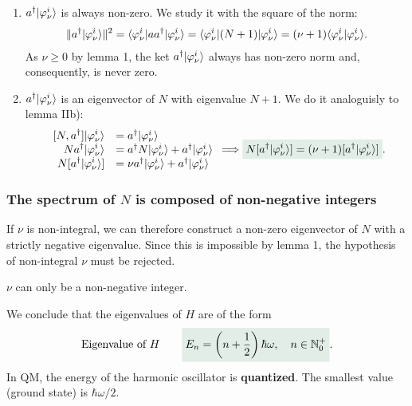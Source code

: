 \begin{itemize}[itemsep=0pt,topsep=0pt]
\begin{enumerate}[itemsep=0pt,topsep=0pt,label=\roman*)]
        \item $a^\dagger|\varphi_\nu^i\rangle$ is always non-zero.
        We study it with the square of the norm:
        \begin{align*}
            \|a^\dagger|\varphi_\nu^i\rangle\|^2=\langle\varphi_\nu^i|aa^\dagger|\varphi_\nu^i\rangle=\langle\varphi_\nu^i|(N+1)|\varphi_\nu^i\rangle=(\nu+1)\langle\varphi_\nu^i|\varphi_\nu^i\rangle.
        \end{align*}
        As $\nu\geq0$ by lemma 1, the ket $a^\dagger|\varphi_\nu^i\rangle$ always has non-zero norm and, consequently, is never zero.
        \item $a^\dagger|\varphi_\nu^i\rangle$ is an eigenvector of $N$ with eigenvalue $N+1$.
        We do it analoguisly to lemma IIb):
        \begin{align*}
            \begin{array}{rl}
            \displaystyle[N,a^\dagger]\ket{\varphi_\nu^i}&=a^\dagger\ket{\varphi_\nu^i}\\
            \displaystyle Na^\dagger\ket{\varphi_\nu^i}&=a^\dagger N\ket{\varphi_\nu^i}+a^\dagger\ket{\varphi_\nu^i}\\
            \displaystyle N[a^\dagger\ket{\varphi_\nu^i}]&=\nu a^\dagger\ket{\varphi_\nu^i}+a^\dagger\ket{\varphi_\nu^i}                
            \end{array}\Longrightarrow
            \highlight{N[a^\dagger\ket{\varphi_\nu^i}]=(\nu+1)[a^\dagger\ket{\varphi_\nu^i}]}.
        \end{align*}
    \end{enumerate}
\end{itemize}

%
\subsubsection{The spectrum of $N$ is composed of non-negative integers}
If $\nu$ is non-integral, we can therefore construct a non-zero eigenvector of $N$ with a strictly negative eigenvalue.
Since this is impossible by lemma 1, the hypothesis of non-integral $\nu$ must be rejected.

\begin{emphasizer}
    $\nu$ can only be a non-negative integer.
\end{emphasizer}

We conclude that the eigenvalues of $H$ are of the form 
\begin{align}
    \text{Eigenvalue of $H$}\qquad\highlight{E_n=\left(n+\frac{1}{2}\right)\hbar\omega,\quad n\in\mathbb{N}^+_0}.
\end{align}
In QM, the energy of the harmonic oscillator is \textbf{quantized}. The smallest value (ground state) is $\hbar\omega/2$.
%
